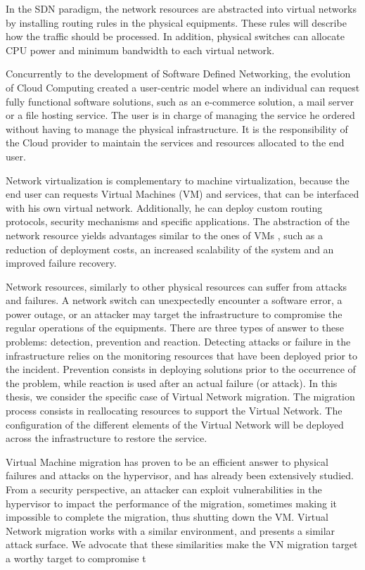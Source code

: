 In the SDN paradigm, the network resources are abstracted into virtual networks by installing routing rules in the physical equipments. These rules will describe how the traffic should be processed. In addition, physical switches can allocate CPU power and minimum bandwidth to each virtual network.

Concurrently to the development of Software Defined Networking, the evolution of Cloud Computing created a user-centric model where an individual can request fully functional software solutions, such as an e-commerce solution, a mail server or a file hosting service. The user is in charge of managing the service he ordered without having to manage the physical infrastructure.
It is the responsibility of the Cloud provider to maintain the services and resources allocated to the end user.

Network virtualization is complementary to machine virtualization, because the end user can requests Virtual Machines (VM) and services, that can be interfaced with his own virtual network. Additionally, he can deploy custom routing protocols, security mechanisms and specific applications. The abstraction of the network resource yields advantages similar to the ones of VMs , such as a reduction of deployment costs, an increased scalability of the system and an improved failure recovery.

Network resources, similarly to other physical resources can suffer from attacks and failures. A network switch can unexpectedly encounter a software error, a power outage, or an attacker may target the infrastructure to compromise the regular operations of the equipments. There are three types of answer to these problems: detection, prevention and reaction. Detecting attacks or failure in the infrastructure relies on the monitoring resources that have been deployed prior to the incident. Prevention consists in deploying solutions prior to the occurrence of the problem, while reaction is used after an actual failure (or attack).
In this thesis, we consider the specific case of Virtual Network migration.
The migration process consists in reallocating resources to support the Virtual Network.
The configuration of the different elements of the Virtual Network will be deployed across the infrastructure to restore the service.

Virtual Machine migration has proven to be an efficient answer to physical failures and attacks on the hypervisor, and has already been extensively studied. From a security perspective, an attacker can exploit vulnerabilities in the hypervisor to impact the performance of the migration, sometimes making it impossible to complete the migration, thus shutting down the VM.
Virtual Network migration works with a similar environment, and presents a similar attack surface. We advocate that these similarities make the VN migration target a worthy target to compromise t

